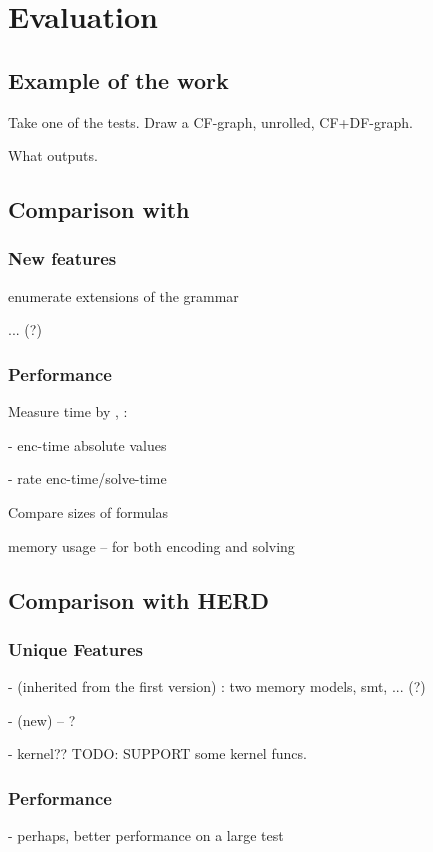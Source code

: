 \chapter{Evaluation}
\label{ch:eval}

\section{Example of the work}
Take one of the tests. Draw a CF-graph, unrolled, CF+DF-graph.

What outputs.


\section{Comparison with \porthos{}}


\subsection{New features}

enumerate extensions of the grammar

... (?)


\subsection{Performance}

Measure time by \porthos[1], \porthos[2]:

- enc-time absolute values

- rate enc-time/solve-time


Compare sizes of formulas


memory usage -- for both encoding and solving




\section{Comparison with HERD}

\subsection{Unique Features}

- (inherited from the first version) : two memory models, smt, ... (?)

- (new) -- ?

- kernel?? TODO: SUPPORT some kernel funcs.


\subsection{Performance}

- perhaps, better performance on a large test